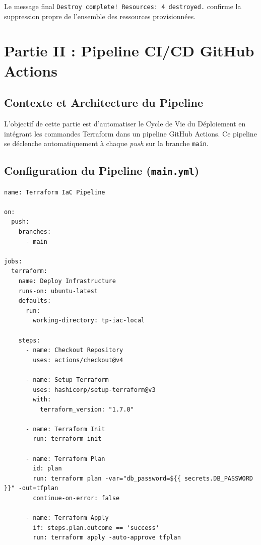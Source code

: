 \documentclass[12pt,a4paper]{report}
\begin{document}
Le message final \texttt{Destroy complete! Resources: 4 destroyed.} confirme
la suppression propre de l'ensemble des ressources provisionnées.

\chapter{Partie II : Pipeline CI/CD GitHub Actions}

\section{Contexte et Architecture du Pipeline}

L'objectif de cette partie est d'automatiser le Cycle de Vie du Déploiement en
intégrant les commandes Terraform dans un pipeline GitHub Actions. Ce pipeline
se déclenche automatiquement à chaque \textit{push} sur la branche \texttt{main}.


\section{Configuration du Pipeline (\texttt{main.yml})}

\begin{lstlisting}[style=yaml, caption={.github/workflows/main.yml --- Pipeline GitHub Actions}]
name: Terraform IaC Pipeline

on:
  push:
    branches:
      - main

jobs:
  terraform:
    name: Deploy Infrastructure
    runs-on: ubuntu-latest
    defaults:
      run:
        working-directory: tp-iac-local

    steps:
      - name: Checkout Repository
        uses: actions/checkout@v4

      - name: Setup Terraform
        uses: hashicorp/setup-terraform@v3
        with:
          terraform_version: "1.7.0"

      - name: Terraform Init
        run: terraform init

      - name: Terraform Plan
        id: plan
        run: terraform plan -var="db_password=${{ secrets.DB_PASSWORD }}" -out=tfplan
        continue-on-error: false

      - name: Terraform Apply
        if: steps.plan.outcome == 'success'
        run: terraform apply -auto-approve tfplan
\end{lstlisting}
\end{document}
